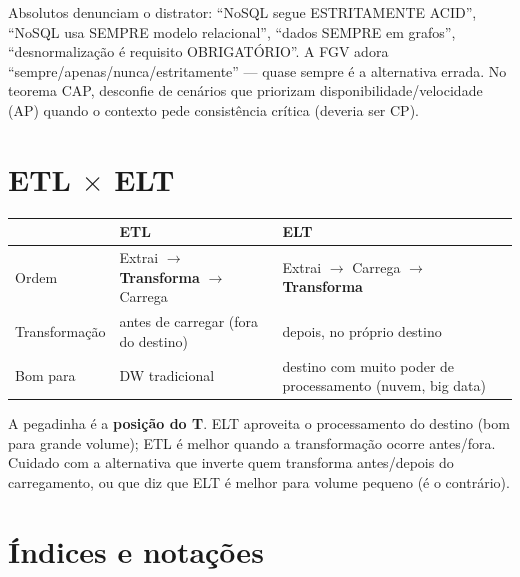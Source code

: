 \begin{pegadinha}
Absolutos denunciam o distrator: ``NoSQL segue ESTRITAMENTE ACID'', ``NoSQL
usa SEMPRE modelo relacional'', ``dados SEMPRE em grafos'', ``desnormalização
é requisito OBRIGATÓRIO''. A FGV adora ``sempre/apenas/nunca/estritamente'' ---
quase sempre é a alternativa errada. No teorema CAP, desconfie de cenários que
priorizam disponibilidade/velocidade (AP) quando o contexto pede consistência
crítica (deveria ser CP).
\end{pegadinha}

\section{ETL $\times$ ELT}

\begin{center}
\begin{tabular}{@{}p{2.6cm}p{4.3cm}p{4.3cm}@{}}
\toprule
& \textbf{ETL} & \textbf{ELT} \\
\midrule
Ordem & Extrai $\to$ \textbf{Transforma} $\to$ Carrega & Extrai $\to$ Carrega $\to$ \textbf{Transforma} \\
Transformação & antes de carregar (fora do destino) & depois, no próprio destino \\
Bom para & DW tradicional & destino com muito poder de processamento (nuvem, big data) \\
\bottomrule
\end{tabular}
\end{center}

\begin{pegadinha}
A pegadinha é a \textbf{posição do T}. ELT aproveita o processamento do
destino (bom para grande volume); ETL é melhor quando a transformação ocorre
antes/fora. Cuidado com a alternativa que inverte quem transforma antes/depois
do carregamento, ou que diz que ELT é melhor para volume pequeno (é o
contrário).
\end{pegadinha}

\section{Índices e notações}

